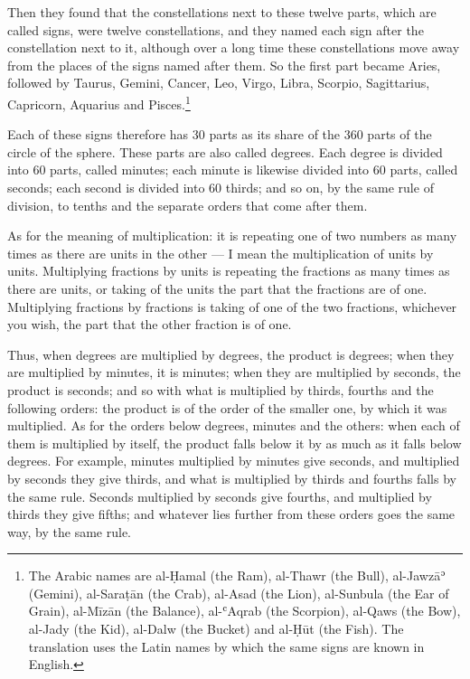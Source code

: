 \documentclass[11pt]{article}
\newcommand{\ArPage}[1]{\marginpar{\footnotesize\color{gray}Ar.\,p.\,#1}}
\begin{document}
\par Then they found that the constellations next to these twelve parts, which are called signs, were twelve constellations, and they named each sign after the constellation next to it, although over a long time these constellations move away from the places of the signs named after them. So the first part became Aries, followed by Taurus, Gemini, Cancer, Leo, Virgo, Libra, Scorpio, Sagittarius, Capricorn, Aquarius and Pisces.\footnote{The Arabic names are al-Ḥamal (the Ram), al-Thawr (the Bull), al-Jawzāʾ (Gemini), al-Saraṭān (the Crab), al-Asad (the Lion), al-Sunbula (the Ear of Grain), al-Mīzān (the Balance), al-ʿAqrab (the Scorpion), al-Qaws (the Bow), al-Jady (the Kid), al-Dalw (the Bucket) and al-Ḥūt (the Fish). The translation uses the Latin names by which the same signs are known in English.}\par
\par Each of these signs therefore has 30 parts as its share of the 360 parts of the circle of the sphere. These parts are also called degrees. Each degree is divided into 60 parts, called minutes; each minute is likewise divided into 60 parts, called seconds; each second is divided into 60 thirds; and so on, by the same rule of division, to tenths and the separate orders that come after them.\par
\par \ArPage{9}As for the meaning of multiplication: it is repeating one of two numbers as many times as there are units in the other — I mean the multiplication of units by units. Multiplying fractions by units is repeating the fractions as many times as there are units, or taking of the units the part that the fractions are of one. Multiplying fractions by fractions is taking of one of the two fractions, whichever you wish, the part that the other fraction is of one.\par
\par Thus, when degrees are multiplied by degrees, the product is degrees; when they are multiplied by minutes, it is minutes; when they are multiplied by seconds, the product is seconds; and so with what is multiplied by thirds, fourths and the following orders: the product is of the order of the smaller one, by which it was multiplied. As for the orders below degrees, minutes and the others: when each of them is multiplied by itself, the product falls below it by as much as it falls below degrees. For example, minutes multiplied by minutes give seconds, and multiplied by seconds they give thirds, and what is multiplied by thirds and fourths falls by the same rule. Seconds multiplied by seconds give fourths, and multiplied by thirds they give fifths; and whatever lies further from these orders goes the same way, by the same rule.\par
\end{document}
